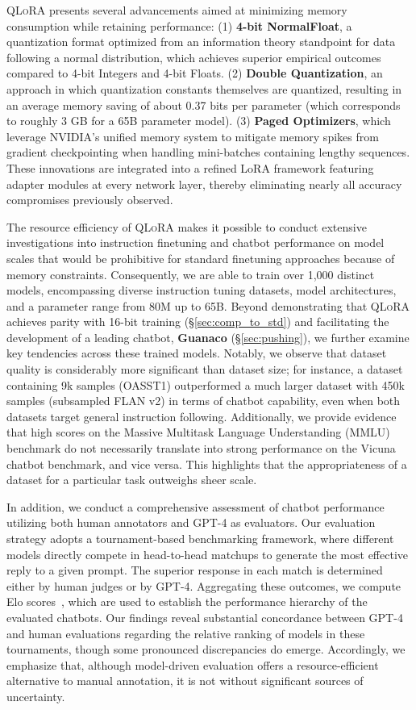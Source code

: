 \textsc{QLoRA} presents several advancements aimed at minimizing memory consumption while retaining performance: (1) \textbf{4-bit NormalFloat}, a quantization format optimized from an information theory standpoint for data following a normal distribution, which achieves superior empirical outcomes compared to 4-bit Integers and 4-bit Floats. (2) \textbf{Double Quantization}, an approach in which quantization constants themselves are quantized, resulting in an average memory saving of about 0.37 bits per parameter (which corresponds to roughly 3 GB for a 65B parameter model). (3) \textbf{Paged Optimizers}, which leverage NVIDIA's unified memory system to mitigate memory spikes from gradient checkpointing when handling mini-batches containing lengthy sequences. These innovations are integrated into a refined LoRA framework featuring adapter modules at every network layer, thereby eliminating nearly all accuracy compromises previously observed.

The resource efficiency of \textsc{QLoRA} makes it possible to conduct extensive investigations into instruction finetuning and chatbot performance on model scales that would be prohibitive for standard finetuning approaches because of memory constraints. Consequently, we are able to train over 1,000 distinct models, encompassing diverse instruction tuning datasets, model architectures, and a parameter range from 80M up to 65B. Beyond demonstrating that \textsc{QLoRA} achieves parity with 16-bit training (\S\ref{sec:comp_to_std}) and facilitating the development of a leading chatbot, \textbf{Guanaco} (\S\ref{sec:pushing}), we further examine key tendencies across these trained models. Notably, we observe that dataset quality is considerably more significant than dataset size; for instance, a dataset containing 9k samples (OASST1) outperformed a much larger dataset with 450k samples (subsampled FLAN v2) in terms of chatbot capability, even when both datasets target general instruction following. Additionally, we provide evidence that high scores on the Massive Multitask Language Understanding (MMLU) benchmark do not necessarily translate into strong performance on the Vicuna chatbot benchmark, and vice versa. This highlights that the appropriateness of a dataset for a particular task outweighs sheer scale.

In addition, we conduct a comprehensive assessment of chatbot performance utilizing both human annotators and GPT-4 as evaluators. Our evaluation strategy adopts a tournament-based benchmarking framework, where different models directly compete in head-to-head matchups to generate the most effective reply to a given prompt. The superior response in each match is determined either by human judges or by GPT-4. Aggregating these outcomes, we compute Elo scores~\citep{elo1967proposed, elo1978rating}, which are used to establish the performance hierarchy of the evaluated chatbots. Our findings reveal substantial concordance between GPT-4 and human evaluations regarding the relative ranking of models in these tournaments, though some pronounced discrepancies do emerge. Accordingly, we emphasize that, although model-driven evaluation offers a resource-efficient alternative to manual annotation, it is not without significant sources of uncertainty.

